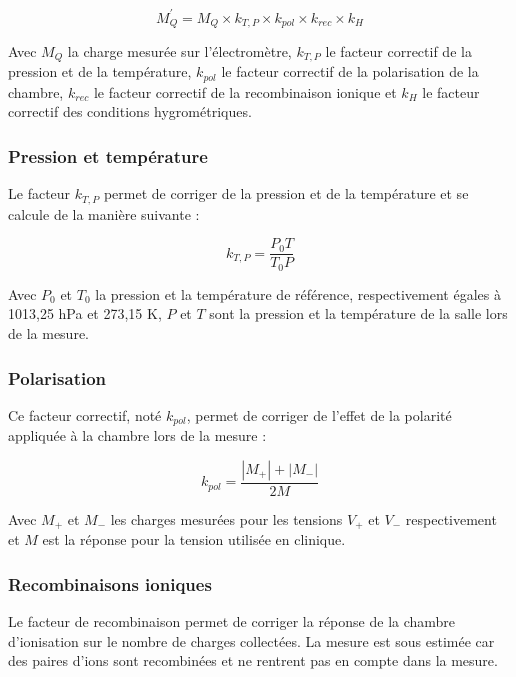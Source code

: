 \documentclass{article}
\begin{document}
\begin{equation}
  M_{Q}^{'} = M_Q \times k_{T,P} \times k_{pol} \times k_{rec} \times k_H
  \label{eq_corr_charge}
\end{equation}

Avec $M_Q$ la charge mesurée sur l'électromètre, $k_{T,P}$ le facteur correctif de la pression et de la température, $k_{pol}$ le facteur correctif de la polarisation de la chambre, $k_{rec}$ le facteur correctif de la recombinaison ionique et $k_H$ le facteur correctif des conditions hygrométriques.

\subsubsection{Pression et température}

Le facteur $k_{T,P}$ permet de corriger de la pression et de la température et se calcule de la manière suivante :

\begin{equation}
  k_{T,P} = \dfrac{P_0T}{T_0P}
  \label{eq_k_TP}
\end{equation}

Avec $P_0$ et $T_0$ la pression et la température de référence, respectivement égales à 1013,25 hPa et 273,15 K, $P$ et $T$ sont la pression et la température de la salle lors de la mesure.

\subsubsection{Polarisation}

Ce facteur correctif, noté $k_{pol}$, permet de corriger de l'effet de la polarité appliquée à la chambre lors de la mesure :

\begin{equation}
  k_{pol} = \dfrac{|M_+| + |M_-|}{2M}
  \label{eq_pol}
\end{equation}

Avec $M_+$ et $M_-$ les charges mesurées pour les tensions $V_+$ et $V_-$ respectivement et $M$ est la réponse pour la tension utilisée en clinique.

\subsubsection{Recombinaisons ioniques}

Le facteur de recombinaison permet de corriger la réponse de la chambre d'ionisation sur le nombre de charges collectées. La mesure est sous estimée car des paires d'ions sont recombinées et ne rentrent pas en compte dans la mesure.
\end{document}

